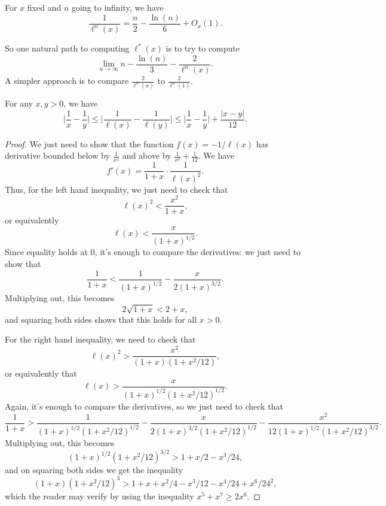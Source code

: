 \documentclass[letterpaper,11pt]{article}
\begin{document}
\begin{cor} For $x$ fixed and $n$ going to infinity, we have
\[
\frac{1}{\ell^n(x)} = \frac{n}{2} - \frac{\ln(n)}{6} + O_x(1).
\]
\end{cor}

So one natural path to computing $\ell^*(x)$ is to try to compute
\[
\lim_{n \rightarrow \infty} n - \frac{\ln(n)}{3} - \frac{2}{\ell^n(x)}.
\]
A simpler approach is to compare $\frac{2}{\ell^n(x)}$ to $\frac{2}{\ell^n(1)}$.

\begin{prop} For any $x, y > 0$, we have
\[
\Big|\frac{1}{x} - \frac{1}{y}\Big| \le \Big|\frac{1}{\ell(x)} - \frac{1}{\ell(y)}\Big| \le \Big|\frac{1}{x} - \frac{1}{y}\Big| + \frac{|x-y|}{12}.
\]
\end{prop}
\begin{proof} We just need to show that the function $f(x) = -1/\ell(x)$ has derivative bounded below by $\frac{1}{x^2}$ and above by $\frac{1}{x^2} + \frac{1}{12}$. We have
\[
f'(x) = \frac{1}{1+x}\cdot \frac{1}{\ell(x)^2}.
\]
Thus, for the left hand inequality, we just need to check that
\[
\ell(x)^2 < \frac{x^2}{1+x},
\]
or equivalently
\[
\ell(x) < \frac{x}{(1+x)^{1/2}}.
\]
Since equality holds at $0$, it's enough to compare the derivatives: we just need to show that
\[
\frac{1}{1+x} < \frac{1}{(1+x)^{1/2}} - \frac{x}{2(1+x)^{3/2}}.
\]
Multiplying out, this becomes
\[
2\sqrt{1+x} < 2+x,
\]
and squaring both sides shows that this holds for all $x > 0$.

For the right hand inequality, we need to check that
\[
\ell(x)^2 > \frac{x^2}{(1+x)(1+x^2/12)},
\]
or equivalently that
\[
\ell(x) > \frac{x}{(1+x)^{1/2}(1+x^2/12)^{1/2}}.
\]
Again, it's enough to compare the derivatives, so we just need to check that
\[
\frac{1}{1+x} > \frac{1}{(1+x)^{1/2}(1+x^2/12)^{1/2}} - \frac{x}{2(1+x)^{3/2}(1+x^2/12)^{1/2}} - \frac{x^2}{12(1+x)^{1/2}(1+x^2/12)^{3/2}}.
\]
Multiplying out, this becomes
\[
(1+x)^{1/2}(1+x^2/12)^{3/2} > 1 + x/2 - x^3/24,
\]
and on squaring both sides we get the inequality
\[
(1+x)(1+x^2/12)^3 > 1 + x + x^2/4 - x^3/12 - x^4/24 + x^6/24^2,
\]
which the reader may verify by using the inequality $x^5 + x^7 \ge 2x^6$.
\end{proof}
\end{document}
